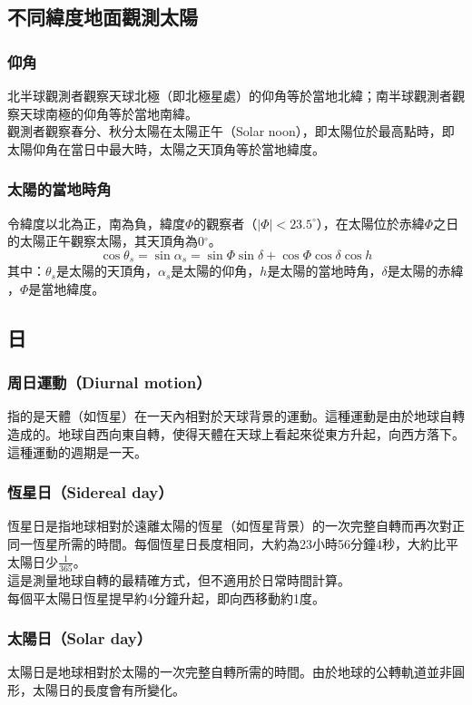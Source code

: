 \documentclass[a4paper,12pt]{report}
\begin{document}
\subsection{不同緯度地面觀測太陽}
\subsubsection{仰角}
北半球觀測者觀察天球北極（即北極星處）的仰角等於當地北緯；南半球觀測者觀察天球南極的仰角等於當地南緯。\\
觀測者觀察春分、秋分太陽在太陽正午（Solar noon），即太陽位於最高點時，即太陽仰角在當日中最大時，太陽之天頂角等於當地緯度。
\subsubsection{太陽的當地時角}
令緯度以北為正，南為負，緯度$\Phi$的觀察者（$|\Phi|<23.5^\circ$），在太陽位於赤緯$\Phi$之日的太陽正午觀察太陽，其天頂角為0$^\circ$。
\[\cos \theta _{s}=\sin \alpha _{s}=\sin \Phi \sin \delta +\cos \Phi \cos \delta \cos h\]
其中：${\displaystyle \theta _{s}}\text{是太陽的天頂角}$，${\displaystyle \alpha _{s}}\text{是太陽的仰角}$，${\displaystyle h}\text{是太陽的當地時角}$，${\displaystyle \delta }\text{是太陽的赤緯}$，${\displaystyle \Phi }\text{是當地緯度}$。
\subsection{日}
\subsubsection{周日運動（Diurnal motion）}
指的是天體（如恆星）在一天內相對於天球背景的運動。這種運動是由於地球自轉造成的。地球自西向東自轉，使得天體在天球上看起來從東方升起，向西方落下。這種運動的週期是一天。
\subsubsection{恆星日（Sidereal day）}
恆星日是指地球相對於遠離太陽的恆星（如恆星背景）的一次完整自轉而再次對正同一恆星所需的時間。每個恆星日長度相同，大約為23小時56分鐘4秒，大約比平太陽日少$\frac{1}{365}$。\\
這是測量地球自轉的最精確方式，但不適用於日常時間計算。\\
每個平太陽日恆星提早約4分鐘升起，即向西移動約1度。
\subsubsection{太陽日（Solar day）}
太陽日是地球相對於太陽的一次完整自轉所需的時間。由於地球的公轉軌道並非圓形，太陽日的長度會有所變化。
\end{document}
